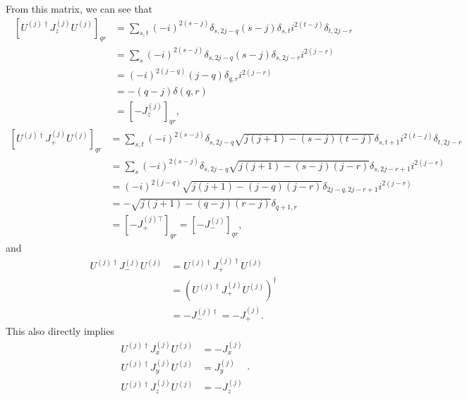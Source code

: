 \documentclass[preprint, 12pt]{revtex4-2}
\numberwithin{equation}{section}
\begin{document}
From this matrix, we can see that
\begin{equation}
    \begin{aligned}
        \left[U^{(j)\dagger}J_z^{(j)}U^{(j)}\right]_{qr} &= \sum_{s,t}(-i)^{2(s-j)}\delta_{s,2j-q}(s-j)\delta_{s,t}i^{2(t-j)}\delta_{t,2j-r} \\
        &= \sum_{s}(-i)^{2(s-j)}\delta_{s,2j-q}(s-j)\delta_{s,2j-r}i^{2(j-r)} \\
        &= (-i)^{2(j-q)}(j-q)\delta_{q, r}i^{2(j-r)} \\
        &= -(q-j)\delta(q,r) \\
        &= \left[-J_z^{(j)}\right]_{qr},
    \end{aligned}
\end{equation}
\begin{equation}
    \begin{aligned}
        \left[U^{(j)\dagger}J_+^{(j)}U^{(j)}\right]_{qr} &= \sum_{s,t}(-i)^{2(s-j)}\delta_{s,2j-q}\sqrt{j(j+1)-(s-j)(t-j)}\delta_{s,t+1}i^{2(t-j)}\delta_{t,2j-r} \\
        &= \sum_{s}(-i)^{2(s-j)}\delta_{s,2j-q}\sqrt{j(j+1)-(s-j)(j-r)}\delta_{s,2j-r+1}i^{2(j-r)} \\
        &= (-i)^{2(j-q)}\sqrt{j(j+1)-(j-q)(j-r)}\delta_{2j-q,2j-r+1}i^{2(j-r)} \\
        &= -\sqrt{j(j+1)-(q-j)(r-j)}\delta_{q+1,r} \\
        &= \left[-J_+^{(j)\top}\right]_{qr} = \left[-J_-^{(j)}\right]_{qr},
    \end{aligned}
\end{equation}
and
\begin{equation}
    \begin{aligned}
        U^{(j)\dagger}J_-^{(j)}U^{(j)} &= U^{(j)\dagger}J_+^{(j)\dagger}U^{(j)} \\
        &= \left(U^{(j)\dagger}J_+^{(j)}U^{(j)}\right)^\dagger \\
        &= -J_-^{(j)\dagger} = -J_+^{(j)}.
    \end{aligned}
\end{equation}
This also directly implies
\begin{equation}
    \begin{aligned}
        U^{(j)\dagger}J_x^{(j)}U^{(j)} &= -J_x^{(j)} \\
        U^{(j)\dagger}J_y^{(j)}U^{(j)} &= J_y^{(j)} \\
        U^{(j)\dagger}J_z^{(j)}U^{(j)} &= -J_z^{(j)}
    \end{aligned}.
\end{equation}
\end{document}
